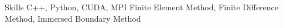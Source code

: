 
\begin{rubric}{Skills}
    C++, Python, CUDA, MPI
\entry*[Numerical]
    Finite Element Method, 
	Finite Difference Method, 
	Immersed Boundary Method
\end{rubric}
